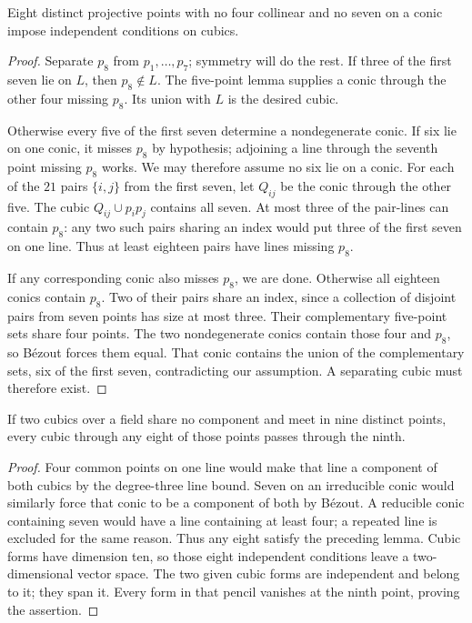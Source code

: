 \begin{lemma}\label{geometry:lem:eightpoints}
Eight distinct projective points with no four collinear and no seven on a conic impose independent conditions on cubics.
\end{lemma}
\begin{proof}
Separate $p_8$ from $p_1,\ldots,p_7$; symmetry will do the rest. If three of the first seven lie on $L$, then $p_8\notin L$. The five-point lemma supplies a conic through the other four missing $p_8$. Its union with $L$ is the desired cubic.

Otherwise every five of the first seven determine a nondegenerate conic. If six lie on one conic, it misses $p_8$ by hypothesis; adjoining a line through the seventh point missing $p_8$ works. We may therefore assume no six lie on a conic. For each of the $21$ pairs $\{i,j\}$ from the first seven, let $Q_{ij}$ be the conic through the other five. The cubic $Q_{ij}\cup p_ip_j$ contains all seven. At most three of the pair-lines can contain $p_8$: any two such pairs sharing an index would put three of the first seven on one line. Thus at least eighteen pairs have lines missing $p_8$.

If any corresponding conic also misses $p_8$, we are done. Otherwise all eighteen conics contain $p_8$. Two of their pairs share an index, since a collection of disjoint pairs from seven points has size at most three. Their complementary five-point sets share four points. The two nondegenerate conics contain those four and $p_8$, so B\'ezout forces them equal. That conic contains the union of the complementary sets, six of the first seven, contradicting our assumption. A separating cubic must therefore exist.
\end{proof}

\begin{theorem}\label{geometry:thm:cayleybacharach}
If two cubics over a field share no component and meet in nine distinct points, every cubic through any eight of those points passes through the ninth.
\end{theorem}
\begin{proof}
Four common points on one line would make that line a component of both cubics by the degree-three line bound. Seven on an irreducible conic would similarly force that conic to be a component of both by B\'ezout. A reducible conic containing seven would have a line containing at least four; a repeated line is excluded for the same reason. Thus any eight satisfy the preceding lemma. Cubic forms have dimension ten, so those eight independent conditions leave a two-dimensional vector space. The two given cubic forms are independent and belong to it; they span it. Every form in that pencil vanishes at the ninth point, proving the assertion.
\end{proof}


